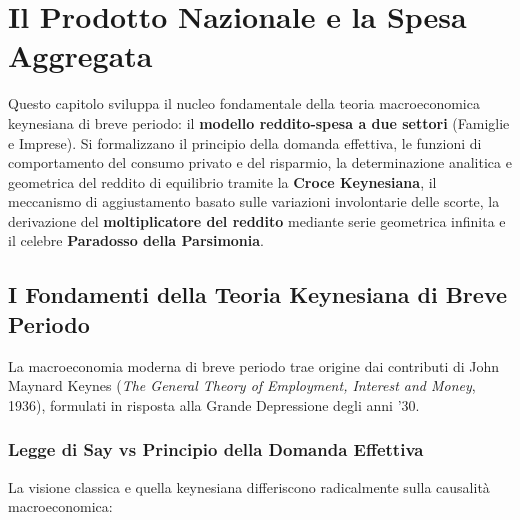 \chapter{Il Prodotto Nazionale e la Spesa Aggregata}
\label{chap:prodotto_nazionale_spesa_aggregata}

\begin{tcolorbox}[colback=navyblue!5!white, colframe=navyblue, title=\textbf{Quadro Concettuale del Capitolo}]
Questo capitolo sviluppa il nucleo fondamentale della teoria macroeconomica keynesiana di breve periodo: il \textbf{modello reddito-spesa a due settori} (Famiglie e Imprese). Si formalizzano il principio della domanda effettiva, le funzioni di comportamento del consumo privato e del risparmio, la determinazione analitica e geometrica del reddito di equilibrio tramite la \textbf{Croce Keynesiana}, il meccanismo di aggiustamento basato sulle variazioni involontarie delle scorte, la derivazione del \textbf{moltiplicatore del reddito} mediante serie geometrica infinita e il celebre \textbf{Paradosso della Parsimonia}.
\end{tcolorbox}

\section{I Fondamenti della Teoria Keynesiana di Breve Periodo}

La macroeconomia moderna di breve periodo trae origine dai contributi di John Maynard Keynes (\textit{The General Theory of Employment, Interest and Money}, 1936), formulati in risposta alla Grande Depressione degli anni '30.

\subsection{Legge di Say vs Principio della Domanda Effettiva}
La visione classica e quella keynesiana differiscono radicalmente sulla causalità macroeconomica:

